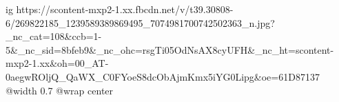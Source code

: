  
 
 
 
 

\ifcmt
   ig https://scontent-mxp2-1.xx.fbcdn.net/v/t39.30808-6/269822185_1239589389869495_7074981700742502363_n.jpg?_nc_cat=108&ccb=1-5&_nc_sid=8bfeb9&_nc_ohc=rsgTi05OdNsAX8cyUFH&_nc_ht=scontent-mxp2-1.xx&oh=00_AT-0aegwROljQ_QaWX_C0FYoeS8dcObAjmKmx5iYG0Lipg&oe=61D87137
	 @width 0.7
	 @wrap center
\fi

